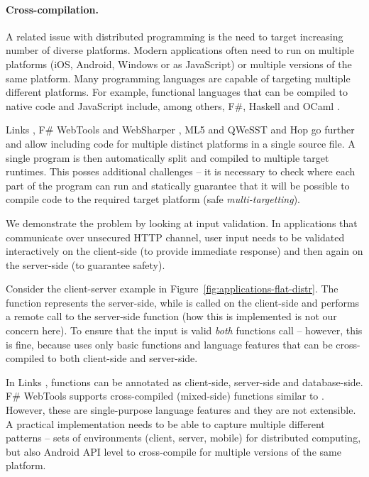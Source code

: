 
\paragraph{Cross-compilation.}
A related issue with distributed programming is the need to target increasing number of diverse
platforms. Modern applications often need to run on multiple platforms (iOS, Android, Windows or
as JavaScript) or multiple versions of the same platform. Many programming languages are capable
of targeting multiple different platforms. For example, functional languages that can be compiled 
to native code and JavaScript include, among others, F\#, Haskell and OCaml \cite{app-ocaml-js}.

Links \cite{app-distributed-links}, F\# WebTools and WebSharper \cite{app-fsharp-webapps,app-fsharp-webtools},
ML5 and QWeSST \cite{app-distributed-ml5, app-distributed-qwesst} and Hop \cite{app-hop-lang} go 
further and allow including code for multiple distinct platforms in a single source file. 
A single program is then automatically split and compiled to multiple target runtimes. This
posses additional challenges -- it is necessary to check where each part of the program can run
and statically guarantee that it will be possible to compile code to the required target 
platform (safe \emph{multi-targetting}).

We demonstrate the problem by looking at input validation. In applications that communicate over 
unsecured HTTP channel, user input needs to be validated interactively on the client-side (to 
provide immediate response) and then again on the server-side (to guarantee safety). 

Consider the client-server example in Figure~\ref{fig:applications-flat-distr}. The 
 function represents the server-side, while  is called 
on the client-side and performs a remote call to the server-side function (how this is implemented 
is not our concern here). To ensure that the input is valid \emph{both} functions call 
 -- however, this is fine, because  uses only basic
functions and language features that can be cross-compiled to both client-side and server-side.

In Links \cite{app-distributed-links}, functions can be annotated as client-side, server-side
and database-side. F\# WebTools \cite{app-fsharp-webtools} supports cross-compiled (mixed-side)
functions similar to . However, these are single-purpose language features 
and they are not extensible. A practical implementation needs to be able to capture multiple
different patterns -- sets of environments (client, server, mobile) for distributed computing,
but also Android API level \cite{app-android-multitarget} to cross-compile for multiple versions 
of the same platform.

